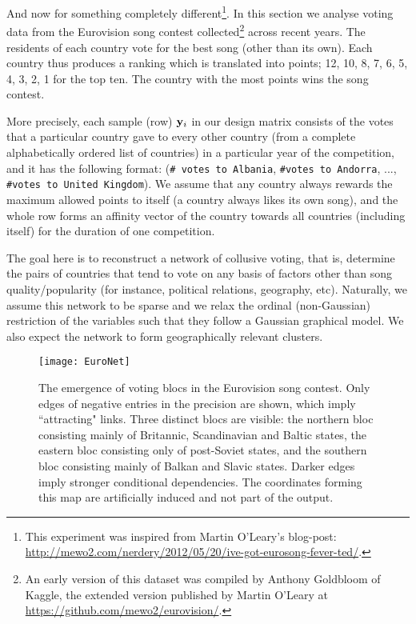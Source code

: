         And now for something completely different\footnote{This experiment was inspired from Martin O'Leary's blog-post: \url{http://mewo2.com/nerdery/2012/05/20/ive-got-eurosong-fever-ted/}.}. In this section we analyse voting data from the Eurovision song contest collected\footnote{An early version of this dataset was compiled by Anthony Goldbloom of Kaggle, the extended version published by Martin O'Leary at \url{https://github.com/mewo2/eurovision/}.} across recent years. The residents of each country vote for the best song (other than its own). Each country thus produces a ranking which is translated into points; 12, 10, 8, 7, 6, 5, 4, 3, 2, 1 for the top ten. The country with the most points wins the song contest.
        
        More precisely, each sample (row) $\mathbf{y}_i$ in our design matrix consists of the votes that a particular country gave to every other country (from a complete alphabetically ordered list of countries) in a particular year of the competition, and it has the following format:  (\texttt{\# votes to Albania}, \texttt{\#votes to Andorra}, ..., \texttt{\#votes to United Kingdom}). We assume that any country always rewards the maximum allowed points to itself (a country always likes its own song), and the whole row forms an affinity vector of the country towards all countries (including itself) for the duration of one competition.
        
        The goal here is to reconstruct a network of collusive voting, that is, determine the pairs of countries that tend to vote on any basis of factors other than song quality/popularity (for instance, political relations, geography, etc). Naturally, we assume this network to be sparse and we relax the ordinal (non-Gaussian)
        restriction of the variables such that they follow a Gaussian graphical model.
        We also expect the network to form geographically relevant clusters.
        
        \begin{figure}[!htbp]
          \centering
          \texttt{[image: EuroNet]}
          \caption[Emergence of voting blocs in data from the Eurovision song contest.]{ \label{fig:Eurovision_results} The emergence of voting blocs in the Eurovision song contest. Only edges of negative entries in the precision are shown, which imply ``attracting" links.
          Three distinct blocs are visible: the northern bloc consisting mainly of Britannic, Scandinavian and Baltic states, the eastern bloc consisting only of post-Soviet states, and the southern bloc consisting mainly of Balkan and Slavic states. Darker edges imply stronger conditional dependencies. The coordinates forming this map are artificially induced and not part of the output.}
        \end{figure}
        
